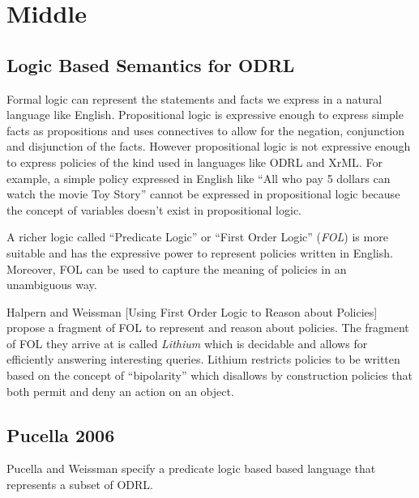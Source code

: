 \chapter{Middle}

\section{Logic Based Semantics for ODRL}


Formal logic can represent the statements and facts we express in a natural language like English. Propositional logic is expressive enough to express simple facts as propositions and uses connectives to allow for the negation, conjunction and disjunction of the facts. However propositional logic is not expressive enough to express policies of the kind used in languages like ODRL and XrML. For example, a simple policy expressed in English like ``All who pay 5 dollars can watch the movie Toy Story'' cannot be expressed in propositional logic because the concept of  variables doesn't exist in propositional logic. 

A richer logic called ``Predicate Logic'' or ``First Order Logic'' (\emph{FOL}) is more suitable and has the expressive power to represent policies written in English. Moreover, FOL can be used to capture the meaning of policies in an unambiguous way.

Halpern and Weissman [Using First Order Logic to Reason about Policies] propose a fragment of FOL to represent and reason about policies. The fragment of FOL they arrive at is called \emph{Lithium} which is decidable and allows for efficiently answering interesting queries. Lithium restricts policies to be written based on the concept of ``bipolarity'' which disallows by construction policies that both permit and deny an action on an object.

\section{Pucella 2006}
Pucella and Weissman \cite{pucella2006} specify a predicate logic based based language that represents a subset of ODRL.


